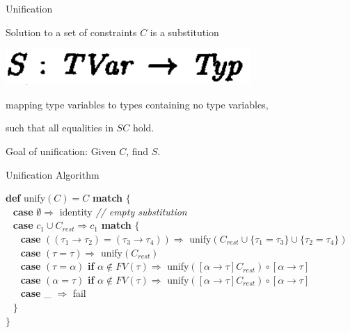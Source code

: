 \documentclass{beamer}
\begin{document}
\begin{frame}{Unification}

Solution to a set of constraints $C$ is a substitution

\includegraphics[scale=0.75]{paper_substitution_type.png}

mapping type variables to types containing no type variables,

such that all equalities in $SC$ hold.

\bigskip

Goal of unification: Given $C$, find $S$.

\end{frame}

\begin{frame}{Unification Algorithm}

\begin{small}

\textbf{def} unify$(C) = C$ \textbf{match} $\{$ \\
$~~$ \textbf{case} $\emptyset \Rightarrow$ identity   \textit{// empty substitution}\\
$~~$ \textbf{case} $c_1 \cup C_{rest} \Rightarrow c_1 $ \textbf{match} $\{$\\
$~~$ $~~$ \textbf{case} $((\tau_1 \rightarrow \tau_2) = (\tau_3 \rightarrow \tau_4)) \Rightarrow$ unify$(C_{rest} \cup \{\tau_1 = \tau_3\} \cup \{\tau_2 = \tau_4\})$\\
$~~$ $~~$ \textbf{case} $(\tau = \tau) \Rightarrow$ unify$(C_{rest})$\\
$~~$ $~~$ \textbf{case} $(\tau = \alpha)$ \textbf{if} $\alpha \notin FV(\tau) \Rightarrow$ unify$([\alpha \rightarrow \tau]C_{rest}) \circ [\alpha \rightarrow \tau]$\\
$~~$ $~~$ \textbf{case} $(\alpha = \tau)$ \textbf{if} $\alpha \notin FV(\tau) \Rightarrow$ unify$([\alpha \rightarrow \tau]C_{rest}) \circ [\alpha \rightarrow \tau]$\\
$~~$ $~~$ \textbf{case} \_ $\Rightarrow$ fail\\
$~~$ $\}$\\
$\}$

\end{small}

\end{frame}
\end{document}
